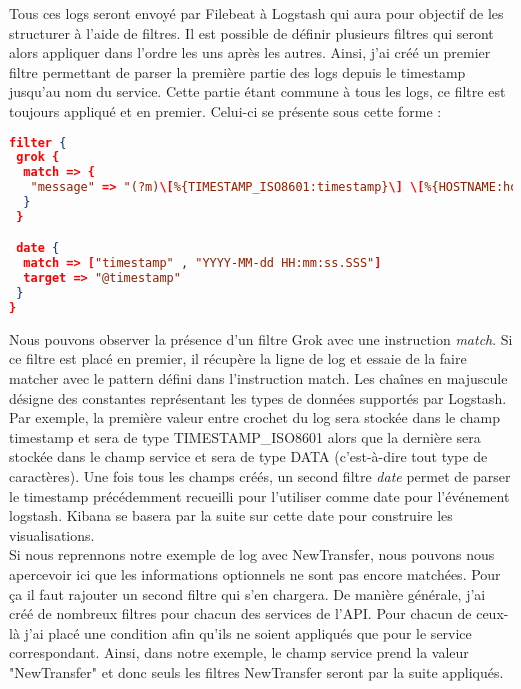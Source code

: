 	Tous ces logs seront envoyé par Filebeat à Logstash qui aura pour objectif de les structurer à l'aide de filtres. Il est possible de définir plusieurs filtres qui seront alors appliquer dans l'ordre les uns après les autres. Ainsi, j'ai créé un premier filtre permettant de parser la première partie des logs depuis le timestamp jusqu'au nom du service. Cette partie étant commune à tous les logs, ce filtre est toujours appliqué et en premier. Celui-ci se présente sous cette forme :
	
\begin{lstlisting}[language=json]
filter {
 grok {
  match => {
   "message" => "(?m)\[%{TIMESTAMP_ISO8601:timestamp}\] \[%{HOSTNAME:host}\] \[%{DATA:thread}\] %{LOGLEVEL:logLevel} %{DATA:class}@%{DATA:method}:%{DATA:line} \- \[ANALYTICS\] \[%{DATA:username}\] \[%{DATA:microservice}\] \[%{DATA:service}\]"
  }
 }

 date {
  match => ["timestamp" , "YYYY-MM-dd HH:mm:ss.SSS"]
  target => "@timestamp"
 }
}
\end{lstlisting}

	Nous pouvons observer la présence d'un filtre Grok avec une instruction \textit{match}. Si ce filtre est placé en premier, il récupère la ligne de log et essaie de la faire matcher avec le pattern défini dans l'instruction match. Les chaînes en majuscule désigne des constantes représentant les types de données supportés par Logstash. Par exemple, la première valeur entre crochet du log sera stockée dans le champ timestamp et sera de type TIMESTAMP\_ISO8601 alors que la dernière sera stockée dans le champ service et sera de type DATA (c'est-à-dire tout type de caractères). Une fois tous les champs créés, un second filtre \textit{date} permet de parser le timestamp précédemment recueilli pour l'utiliser comme date pour l'événement logstash. Kibana se basera par la suite sur cette date pour construire les visualisations. \\
	
	Si nous reprennons notre exemple de log avec NewTransfer, nous pouvons nous apercevoir ici que les informations optionnels ne sont pas encore matchées. Pour ça il faut rajouter un second filtre qui s'en chargera. De manière générale, j'ai créé de nombreux filtres pour chacun des services de l'API. Pour chacun de ceux-là j'ai placé une condition afin qu'ils ne soient appliqués que pour le service correspondant. Ainsi, dans notre exemple, le champ service prend la valeur "NewTransfer" et donc seuls les filtres NewTransfer seront par la suite appliqués. \\
	
